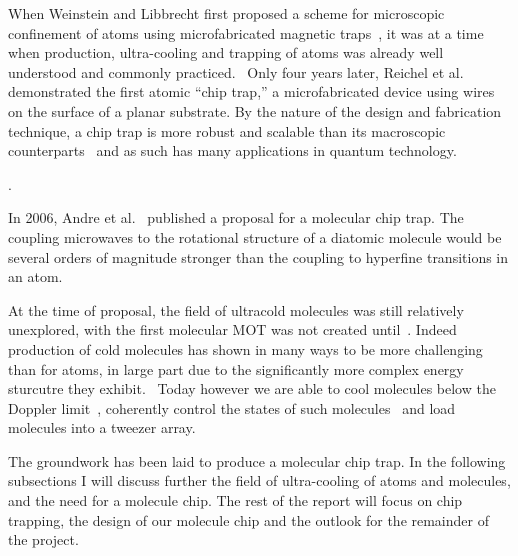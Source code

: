 When Weinstein and Libbrecht first proposed a scheme for microscopic confinement
of atoms using microfabricated magnetic traps~\cite{PhysRevA.52.4004}, it was at
a time when production, ultra-cooling and trapping of atoms was already well
understood and commonly practiced.~ Only four
years later, Reichel et al.~\cite{Reichel1999} demonstrated the first atomic
``chip trap,'' a microfabricated device using wires on the surface of a planar
substrate. By the nature of the design and fabrication technique, a chip trap is
more robust and scalable than its macroscopic counterparts~ and
as such has many applications in quantum technology.

.

In 2006, Andre et al.~\cite{Andre2006} published a proposal for a molecular chip
trap. The coupling microwaves to the rotational structure of a diatomic molecule
would be several orders of magnitude stronger than the coupling to hyperfine
transitions in an atom. 

At the time of proposal, the field of ultracold molecules was still relatively
unexplored, with the first molecular MOT was not created until~. Indeed production of cold molecules has shown in many ways to be more
challenging than for atoms, in large part due to the significantly more complex
energy sturcutre they exhibit.~ Today however we are able to cool
molecules below the Doppler limit~\cite{Truppe2017}, coherently control the
states of such molecules~\cite{PhysRevLett.120.163201} and load molecules into a
tweezer array.~\cite{Anderegg2019}

The groundwork has been laid to produce a molecular chip trap. In the following
subsections I will discuss further the field of ultra-cooling of atoms and
molecules, and the need for a molecule chip. The rest of the report will focus
on chip trapping, the design of our molecule chip and the outlook for the
remainder of the project.

